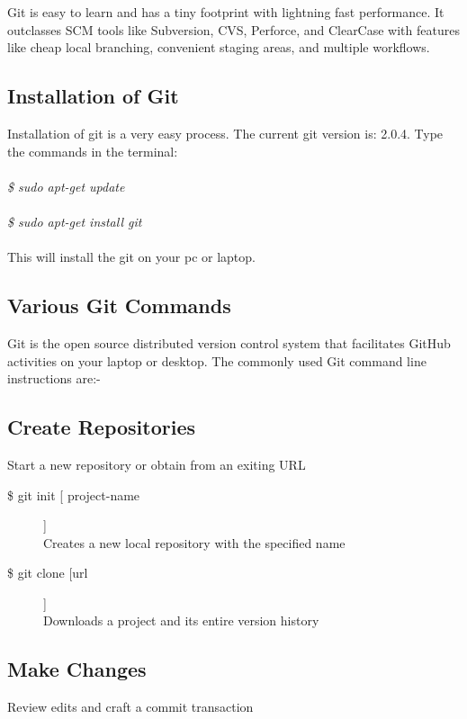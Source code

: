 \noindent Git is easy to learn and has a tiny footprint with lightning fast performance. It outclasses SCM tools like Subversion, CVS, Perforce, and ClearCase with features like cheap local branching, convenient staging areas, and multiple workflows.

\subsection{Installation of Git}

Installation of git is a very easy process.
The current git version is: 2.0.4.
Type the commands in the terminal:\\\\
\emph{
\$ sudo apt-get update\\\\
\$ sudo apt-get install git\\\\}
This will install the git on your pc or laptop.

\subsection{Various Git Commands}

Git is the open source distributed version control system that facilitates GitHub activities on your laptop or desktop. The commonly used Git command line instructions are:-\\

\subsection*{Create Repositories}
Start a new repository or obtain from an exiting URL

\begin{description}

\item [\$ git init [ project-name]]\\
Creates a new local repository with the specified name
\item [\$ git clone [url]]\\
Downloads a project and its entire version history

\end{description}


\subsection*{Make Changes}
Review edits and craft a commit transaction


